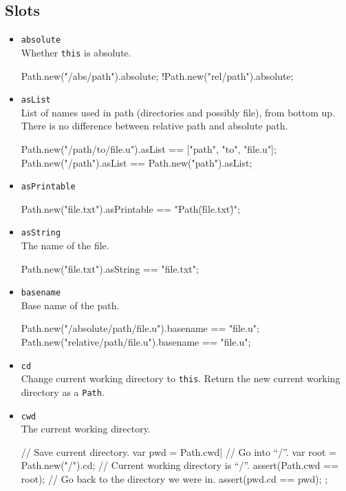 \subsection{Slots}
\begin{itemize}
\item \lstinline|absolute|\\
  Whether \lstinline|this| is absolute.
\begin{urbiassert}
Path.new("/abs/path").absolute;
!Path.new("rel/path").absolute;
\end{urbiassert}

\item \lstinline|asList|\\
  List of names used in path (directories and possibly file), from
  bottom up. There is no difference between relative path and absolute
  path.
\begin{urbiassert}
Path.new("/path/to/file.u").asList == ["path", "to", "file.u"];
Path.new("/path").asList           == Path.new("path").asList;
\end{urbiassert}

\item \lstinline|asPrintable|\\
\begin{urbiassert}
Path.new("file.txt").asPrintable == "Path(\"file.txt\")";
\end{urbiassert}

\item \lstinline|asString|\\
  The name of the file.
\begin{urbiassert}
Path.new("file.txt").asString == "file.txt";
\end{urbiassert}

\item \lstinline|basename|\\
  Base name of the path.
\begin{urbiassert}
Path.new("/absolute/path/file.u").basename == "file.u";
Path.new("relative/path/file.u").basename  == "file.u";
\end{urbiassert}

\item \lstinline|cd|\\
  Change current working directory to \lstinline|this|. Return the new
  current working directory as a \lstinline|Path|.

\item \lstinline|cwd|\\
  The current working directory.
\begin{urbiscript}
{
  // Save current directory.
  var pwd = Path.cwd|
  // Go into ``/''.
  var root = Path.new("/").cd;
  // Current working directory is ``/''.
  assert(Path.cwd == root);
  // Go back to the directory we were in.
  assert(pwd.cd == pwd);
};
\end{urbiscript}


\end{itemize}
